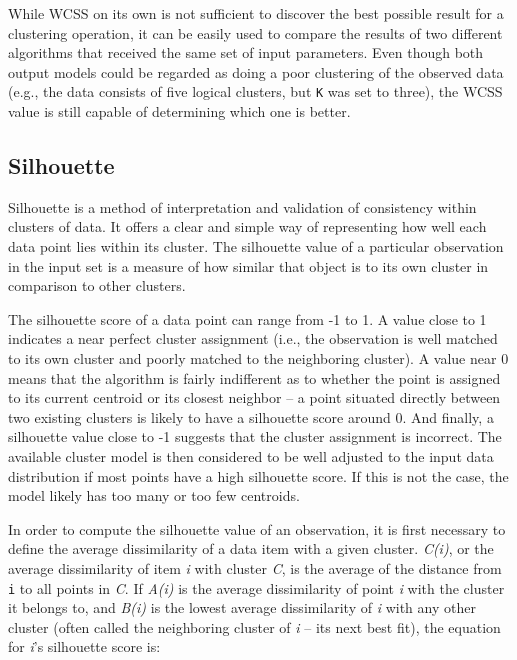 \documentclass{l4proj}
\begin{document}
While WCSS on its own is not sufficient to discover the best possible result for a clustering operation, it can be easily used to compare the results of two different algorithms that received the same set of input parameters. Even though both output models could be regarded as doing a poor clustering of the observed data (e.g., the data consists of five logical clusters, but \texttt{K} was set to three), the WCSS value is still capable of determining which one is better.

\subsection{Silhouette}

Silhouette\cite{Silhouette} is a method of interpretation and validation of consistency within clusters of data. It offers a clear and simple way of representing how well each data point lies within its cluster. The silhouette value of a particular observation in the input set is a measure of how similar that object is to its own cluster in comparison to other clusters.

The silhouette score of a data point can range from -1 to 1. A value close to 1 indicates a near perfect cluster assignment (i.e., the observation is well matched to its own cluster and poorly matched to the neighboring cluster). A value near 0 means that the algorithm is fairly indifferent as to whether the point is assigned to its current centroid or its closest neighbor -- a point situated directly between two existing clusters is likely to have a silhouette score around 0. And finally, a silhouette value close to -1 suggests that the cluster assignment is incorrect. The available cluster model is then considered to be well adjusted to the input data distribution if most points have a high silhouette score. If this is not the case, the model likely has too many or too few centroids.

In order to compute the silhouette value of an observation, it is first necessary to define the average dissimilarity of a data item with a given cluster. \textit{C(i)}, or the average dissimilarity of item \textit{i} with cluster \textit{C}, is the average of the distance from \texttt{i} to all points in \textit{C}. If \textit{A(i)} is the average dissimilarity of point \textit{i} with the cluster it belongs to, and \textit{B(i)} is the lowest average dissimilarity of \textit{i} with any other cluster (often called the neighboring cluster of \textit{i} -- its next best fit), the equation for \textit{i}'s silhouette score is:
\end{document}
